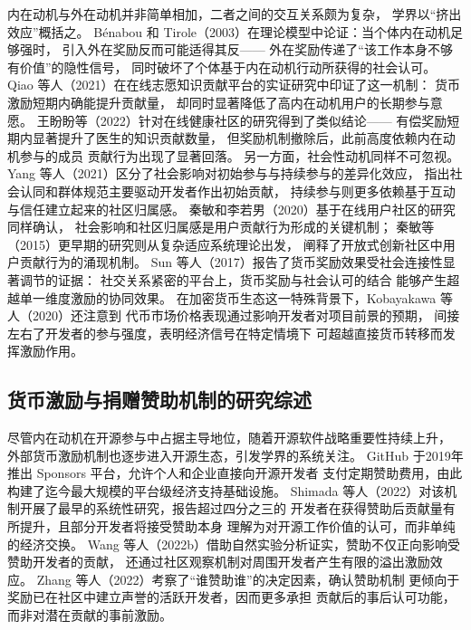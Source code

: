 \documentclass[
    type = master, %
    degree = professional,        %
    decl-page,  %
    twoside,                %
    fontset = fandol %
  ]{njuthesis}
\begin{document}
内在动机与外在动机并非简单相加，二者之间的交互关系颇为复杂，
学界以“挤出效应”概括之。
Bénabou 和 Tirole（2003）在理论模型中论证：当个体内在动机足够强时，
引入外在奖励反而可能适得其反——
外在奖励传递了“该工作本身不够有价值”的隐性信号，
同时破坏了个体基于内在动机行动所获得的社会认可\cite{benabou2003intrinsic}。
Qiao 等人（2021）在在线志愿知识贡献平台的实证研究中印证了这一机制：
货币激励短期内确能提升贡献量，
却同时显著降低了高内在动机用户的长期参与意愿\cite{qiao2021mitigating}。
王盼盼等（2022）针对在线健康社区的研究得到了类似结论——
有偿奖励短期内显著提升了医生的知识贡献数量，
但奖励机制撤除后，此前高度依赖内在动机参与的成员
贡献行为出现了显著回落\cite{wang2022reward}。
另一方面，社会性动机同样不可忽视。
Yang 等人（2021）区分了社会影响对初始参与与持续参与的差异化效应，
指出社会认同和群体规范主要驱动开发者作出初始贡献，
持续参与则更多依赖基于互动与信任建立起来的社区归属感\cite{yang2021differential}。
秦敏和李若男（2020）基于在线用户社区的研究同样确认，
社会影响和社区归属感是用户贡献行为形成的关键机制\cite{qin2020contribution}；
秦敏等（2015）更早期的研究则从复杂适应系统理论出发，
阐释了开放式创新社区中用户贡献行为的涌现机制\cite{qin2015cas}。
Sun 等人（2017）报告了货币奖励效果受社会连接性显著调节的证据：
社交关系紧密的平台上，货币奖励与社会认可的结合
能够产生超越单一维度激励的协同效果\cite{sun2017motivation}。
在加密货币生态这一特殊背景下，Kobayakawa 等人（2020）还注意到
代币市场价格表现通过影响开发者对项目前景的预期，
间接左右了开发者的参与强度，表明经济信号在特定情境下
可超越直接货币转移而发挥激励作用\cite{kobayakawa2020impact}。

\subsection{货币激励与捐赠赞助机制的研究综述}

尽管内在动机在开源参与中占据主导地位，随着开源软件战略重要性持续上升，
外部货币激励机制也逐步进入开源生态，引发学界的系统关注。
GitHub 于2019年推出 Sponsors 平台，允许个人和企业直接向开源开发者
支付定期赞助费用，由此构建了迄今最大规模的平台级经济支持基础设施。
Shimada 等人（2022）对该机制开展了最早的系统性研究，报告超过四分之三的
开发者在获得赞助后贡献量有所提升，且部分开发者将接受赞助本身
理解为对开源工作价值的认可，而非单纯的经济交换\cite{shimada2022github}。
Wang 等人（2022b）借助自然实验分析证实，赞助不仅正向影响受赞助开发者的贡献，
还通过社区观察机制对周围开发者产生有限的溢出激励效应\cite{wang2022influence}。
Zhang 等人（2022）考察了“谁赞助谁”的决定因素，确认赞助机制
更倾向于奖励已在社区中建立声誉的活跃开发者，因而更多承担
贡献后的事后认可功能，而非对潜在贡献的事前激励\cite{zhang2022who}。
\end{document}
